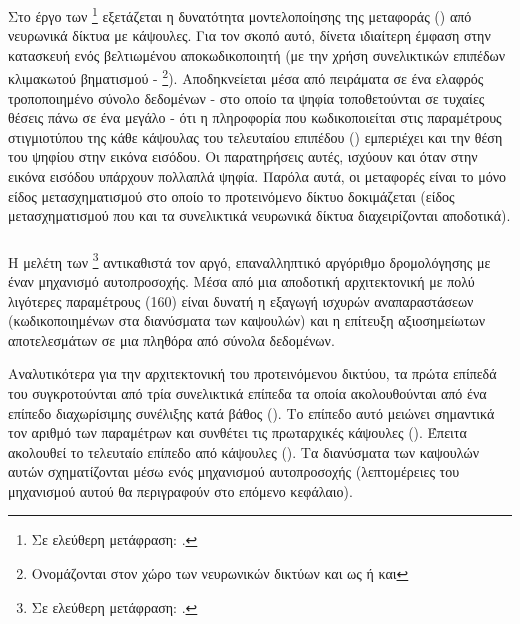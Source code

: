 \subsubsection{}

Στο έργο των  \footnote{Σε ελεύθερη μετάφραση: .} \cite{luo2020capsnet} εξετάζεται η δυνατότητα μοντελοποίησης της μεταφοράς () από νευρωνικά δίκτυα με κάψουλες. Για τον σκοπό αυτό, δίνετα ιδιαίτερη έμφαση στην κατασκευή ενός βελτιωμένου αποκωδικοποιητή (με την χρήση συνελικτικών επιπέδων κλιμακωτού βηματισμού - \footnote{Ονομάζονται στον χώρο των νευρωνικών δικτύων και ως  ή και }). Αποδηκνείεται μέσα από πειράματα σε ένα ελαφρός τροποποιημένο σύνολο δεδομένων  - στο οποίο τα ψηφία τοποθετούνται σε τυχαίες θέσεις πάνω σε ένα μεγάλο  - ότι η πληροφορία που κωδικοποιείται στις παραμέτρους στιγμιοτύπου της κάθε κάψουλας του τελευταίου επιπέδου () εμπεριέχει και την θέση του ψηφίου στην εικόνα εισόδου. Οι παρατηρήσεις αυτές, ισχύουν και όταν στην εικόνα εισόδου υπάρχουν πολλαπλά ψηφία. Παρόλα αυτά, οι μεταφορές είναι το μόνο είδος μετασχηματισμού στο οποίο το προτεινόμενο δίκτυο δοκιμάζεται (είδος μετασχηματισμού που και τα συνελικτικά νευρωνικά δίκτυα διαχειρίζονται αποδοτικά).

\subsubsection{}

Η μελέτη των  \footnote{Σε ελεύθερη μετάφραση: .} \cite{mazzia2021efficient} αντικαθιστά τον αργό, επαναλληπτικό αργόριθμο δρομολόγησης με έναν μηχανισμό αυτοπροσοχής. Μέσα από μια αποδοτική αρχιτεκτονική με πολύ λιγότερες παραμέτρους (160) είναι δυνατή η εξαγωγή ισχυρών αναπαραστάσεων (κωδικοποιημένων στα διανύσματα των καψουλών) και η επίτευξη αξιοσημείωτων αποτελεσμάτων σε μια πληθόρα από σύνολα δεδομένων.\par

 Αναλυτικότερα για την αρχιτεκτονική του προτεινόμενου δικτύου, τα πρώτα επίπεδά του συγκροτούνται από τρία συνελικτικά επίπεδα τα οποία ακολουθούνται από ένα επίπεδο διαχωρίσιμης συνέλιξης κατά βάθος (). Το επίπεδο αυτό μειώνει σημαντικά τον αριθμό των παραμέτρων και συνθέτει τις πρωταρχικές κάψουλες (). Έπειτα ακολουθεί το τελευταίο επίπεδο από κάψουλες  (). Τα διανύσματα των καψουλών αυτών σχηματίζονται μέσω ενός μηχανισμού αυτο\textendash προσοχής (λεπτομέρειες του μηχανισμού αυτού θα περιγραφούν στο επόμενο κεφάλαιο).\par

